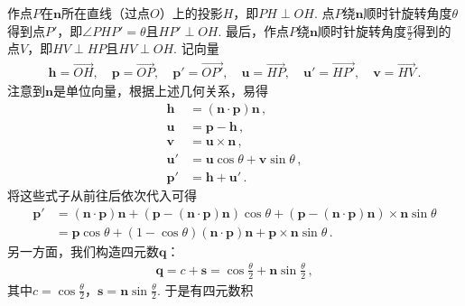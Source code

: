 作点$P$在$\bm n$所在直线（过点$O$）上的投影$H$，即$PH\perp OH$.
点$P$绕$\bm n$顺时针旋转角度$\theta$得到点$P'$，即$\angle PHP'=\theta$且$HP'\perp OH$.
最后，作点$P$绕$\bm n$顺时针旋转角度$\displaystyle\frac{\pi}{2}$得到的点$V$，即$HV\perp HP$且$HV\perp OH$.
记向量
\begin{align}
    \bm h=\overrightarrow{OH},\quad
    \bm p=\overrightarrow{OP},\quad
    \bm p'=\overrightarrow{OP'},\quad
    \bm u=\overrightarrow{HP},\quad
    \bm u'=\overrightarrow{HP'},\quad
    \bm v=\overrightarrow{HV}\, .
\end{align}
注意到$\bm n$是单位向量，根据上述几何关系，易得
\begin{align}
    \bm h  & =(\bm n\cdot\bm p)\bm n\, ,          \\
    \bm u  & =\bm p-\bm h\, ,                     \\
    \bm v  & =\bm u\times\bm n\, ,                \\
    \bm u' & =\bm u\cos\theta+\bm v\sin\theta\, , \\
    \bm p' & =\bm h+\bm u'\, .
\end{align}
将这些式子从前往后依次代入可得
\begin{align}
    \bm p' & =(\bm n\cdot\bm p)\bm n+(\bm p-(\bm n\cdot\bm p)\bm n)\cos\theta+(\bm p-(\bm n\cdot\bm p)\bm n)\times\bm n\sin\theta\nonumber \\
           & =\bm p\cos\theta+(1-\cos\theta)(\bm n\cdot\bm p)\bm n+\bm p\times\bm n\sin\theta\, .
\end{align}
另一方面，我们构造四元数$\bm q$：
\begin{align}
    \bm q=c+\bm s=\cos\frac{\theta}{2}+\bm n\sin\frac{\theta}{2}\, ,
\end{align}
其中$\displaystyle c=\cos\frac{\theta}{2}$，$\displaystyle \bm s=\bm n\sin\frac{\theta}{2}$.
于是有四元数积

